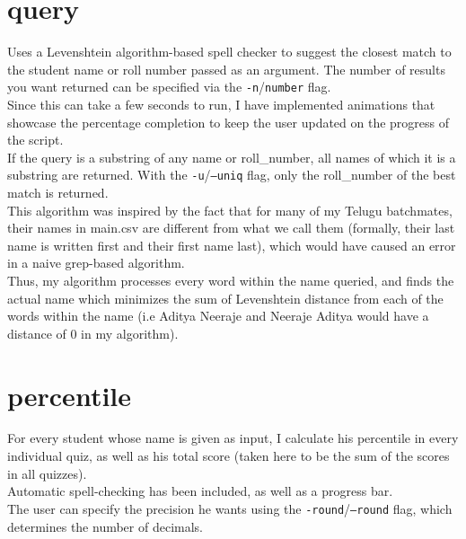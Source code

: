 \documentclass{article}
\begin{document}
    \section{query}
    Uses a Levenshtein algorithm-based spell checker\cite{url:levenshtein} to suggest the closest match to the student name or roll number passed as an argument. The number of results you want returned can be specified via the \texttt{-n}/\texttt{number} flag.\\
    Since this can take a few seconds to run, I have implemented animations that showcase the percentage completion to keep the user updated on the progress of the script.\\
    If the query is a substring of any name or roll\_number, all names of which it is a substring are returned. With the \texttt{-u}/\texttt{--uniq} flag, only the roll\_number of the best match is returned.\\
    This algorithm was inspired by the fact that for many of my Telugu batchmates, their names in main.csv are different from what we call them (formally, their last name is written first and their first name last), which would have caused an error in a naive grep-based algorithm.\\
    Thus, my algorithm processes every word within the name queried, and finds the actual name which minimizes the sum of Levenshtein distance from each of the words within the name (i.e Aditya Neeraje and Neeraje Aditya would have a distance of 0 in my algorithm). 

    \section{percentile}
    For every student whose name is given as input, I calculate his percentile in every individual quiz, as well as his total score (taken here to be the sum of the scores in all quizzes).\\
    Automatic spell-checking has been included, as well as a progress bar.\\
    The user can specify the precision he wants using the \texttt{-round}/\texttt{--round} flag, which determines the number of decimals.\\
\end{document}
